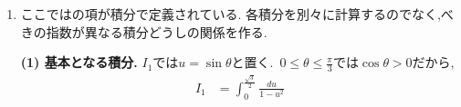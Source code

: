 \begin{enumerate}[label=\textbf{問\arabic*.},leftmargin=3.8em,format=\bookitemlink{practice-entrance}{solution}{problem}]
                \[
                 \overrightarrow{OA_n}=-\frac{\boldsymbol p_n+\boldsymbol q_n}{2},
                 \qquad
                 |OA_n|\leq\frac{|\boldsymbol p_n|+|\boldsymbol q_n|}{2}.
                \]
                右辺は$0$に近づく.ほかの頂点についても$\boldsymbol p_n,\boldsymbol q_n$の符号が変わるだけだから,
                同じ評価ができる.したがって四つの頂点はすべて$O$に近づく.
                \par\noindent
                \textbf{(4) 正方形と複素数の積.}
                正方形が反時計回りに並んでいるとき,$\boldsymbol q_n$は$\boldsymbol p_n$を反時計回りに$\displaystyle \frac{\pi}{2}$回転したものである.
                それぞれを表す複素数を$z_n,w_n$とすると,$w_n=iz_n$である.
                \,$\displaystyle t=\frac{1}{2}$を連立式に入れると,
                \[
                 z_{n+1}=\frac{1+i}{2}z_n,
                 \qquad
                 w_{n+1}=iz_{n+1}.
                \]
                したがって次も正方形であり,
                \[
                 z_n=\left(\frac{1+i}{2}\right)^n z_0.
                \]
                ここで,
                \[
                 \frac{1+i}{2}
                 =\frac1{\sqrt2}\left(\cos\frac\pi4+i\sin\frac\pi4\right).
                \]
                より,
                \[
                 z_n=2^{-\frac{n}{2}}
                 \left(\cos\frac{n\pi}{4}+i\sin\frac{n\pi}{4}\right)z_0.
                \]
                よって辺長は$\ell\,2^{-\frac{n}{2}}$,有向線分の回転角は反時計回りに$\displaystyle \frac{n\pi}{4}$である.
                \par
                正方形では内分という操作が,中心を固定した回転と縮小そのものになる.
                一般の平行四辺形については,二本の辺を混ぜる連立式と面積の等比性が成り立つが,
                図形全体が毎回同じ平面回転と一様な縮小を受けるとは限らない.
          \item ここではの項が積分で定義されている.
                各積分を別々に計算するのでなく,べきの指数が異なる積分どうしの関係を作る.
                \par\noindent
                \textbf{(1) 基本となる積分.}
                $I_1$では$u=\sin\theta$と置く.
                \,$\displaystyle 0\leq\theta\leq\frac{\pi}{3}$では$\cos\theta>0$だから,
                \[
                 \begin{aligned}
                 I_1&=\int_0^{\frac{\sqrt3}{2}}\frac{du}{1-u^2}\\

\end{aligned}\]
\end{enumerate}
